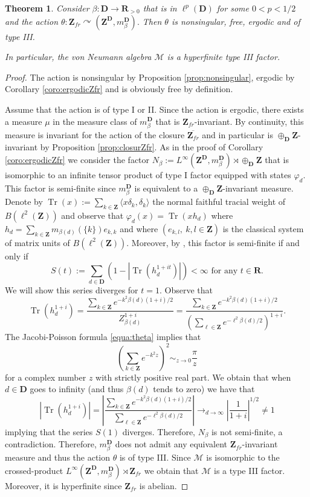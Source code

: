 \documentclass[a4paper,12pt]{amsart}
\numberwithin{equation}{section}
\newtheorem{theo}{Theorem}[section]
\theoremstyle{definition}
\newcommand{\act}{\curvearrowright}
\newcommand{\D}{\mathbf D}
\newcommand{\scrM}{\mathscr M}
\newcommand{\mbD}{m_\beta^\D}
\newcommand{\R}{\mathbf{R}}
\DeclareMathOperator{\Tr}{Tr}
\newcommand{\Z}{\mathbf{Z}}
\begin{document}
\begin{theo}\label{theo:type}
Consider $\beta:\D\to\R_{>0}$ that is in $\ell^{p}(\D)$ for some $0<p<1/2$ and the action $\theta:\Z_{fr}\act (\Z^\D , \mbD).$
Then $\theta$ is nonsingular, free, ergodic and of type III.

In particular, the von Neumann algebra $\scrM$ is a hyperfinite type III factor.
\end{theo}
\begin{proof}
The action is nonsingular by Proposition \ref{prop:nonsingular}, {ergodic by Corollary \ref{coro:ergodicZfr}} and is obviously free by definition.

Assume that the action is of type I or II.
Since the action is ergodic, there exists a measure $\mu$ in the measure class of $\mbD$ that is $\Z_{fr}$-invariant.
By continuity, this measure is invariant for the action of the closure $\overline{\Z_{fr}}$ and in particular is $\oplus_\D\Z$-invariant by Proposition \ref{prop:closurZfr}.
As in the proof of Corollary \ref{coro:ergodicZfr} we consider the factor $N_\beta:=L^\infty(\Z^\D, \mbD)\rtimes \oplus_\D\Z$ that is isomorphic to an infinite tensor product of type I factor equipped with states $\varphi_d$.
This factor is semi-finite since $\mbD$ is equivalent to a $\oplus_\D \Z$-invariant measure.
Denote by $\Tr(x):= \sum_{k\in\Z}  \langle x \delta_k,\delta_k\rangle$ the normal faithful tracial weight of $B(\ell^2(\Z))$ and observe that $\varphi_d(x) = \Tr( x h_d)$ where $h_d = \sum_{k\in\Z} m_{\beta(d)}(\{k\}) e_{k,k}$ and where $(e_{k,l},\ k,l\in\Z)$ is the classical system of matrix units of $B(\ell^2(\Z))$.
Moreover, by \cite[XIV, Theorem 1.14]{TakesakiIII}, this factor is semi-finite if and only if 
$$S(t):=\sum_{d\in\D} ( 1 - | \Tr( h_d^{1+it}) | ) <\infty \text{ for any } t\in\R.$$
We will show this series diverges for $t=1$. 
Observe that $$\Tr(h_d^{1+i}) = \dfrac{\sum_{k\in\Z}e^{-k^2 \beta(d) (1+i)/2}  }{Z_{\beta(d)}^{1+i}} = \dfrac{\sum_{k\in\Z}e^{-k^2 \beta(d) (1+i)/2}  }{(\sum_{\ell\in\Z}e^{-\ell^2 \beta(d)/2})^{1+i}}.$$
The Jacobi-Poisson formula \eqref{equa:theta} implies that 
$$\left( \sum_{k\in\Z} e^{-k^2 z } \right)^2 \sim_{z\to 0} \dfrac{\pi}{z}$$
for a complex number $z$ with strictly positive real part.
We obtain that when $d\in\D$ goes to infinity (and thus $\beta(d)$ tends to zero) we have that
$$|\Tr(h_d^{1+i})|=|\dfrac{\sum_{k\in\Z}e^{-k^2 \beta(d) (1+i)/2}  }{\sum_{\ell\in\Z}e^{-\ell^2 \beta(d)/2} }| \to_{d\to\infty} |\dfrac{1}{1+i}|^{1/2} \neq 1$$ implying that the series $S(1)$ diverges.
Therefore, $N_\beta$ is not semi-finite, a contradiction.
Therefore, $\mbD$ does not admit any equivalent $\Z_{fr}$-invariant measure and thus the action $\theta$ is of type III.
Since $\scrM$ is isomorphic to the crossed-product $L^\infty(\Z^\D,\mbD)\rtimes \Z_{fr}$ we obtain that $\scrM$ is a type III factor.
Moreover, it is hyperfinite since $\Z_{fr}$ is abelian.
\end{proof}
\end{document}
